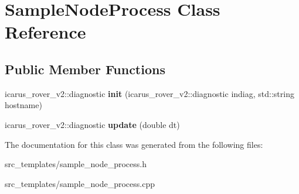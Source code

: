 \hypertarget{classSampleNodeProcess}{}\section{Sample\+Node\+Process Class Reference}
\label{classSampleNodeProcess}
\subsection*{Public Member Functions}
\begin{DoxyCompactItemize}
\item 
\mbox{\label{classSampleNodeProcess_ad4cb47b8fc3e7f8bbb010193188fa9b3}} 
icarus\+\_\+rover\+\_\+v2\+::diagnostic {\bfseries init} (icarus\+\_\+rover\+\_\+v2\+::diagnostic indiag, std\+::string hostname)
\item 
\mbox{\label{classSampleNodeProcess_ae6f2199a0b5394d819927995e5fb2ed9}} 
icarus\+\_\+rover\+\_\+v2\+::diagnostic {\bfseries update} (double dt)
\end{DoxyCompactItemize}


The documentation for this class was generated from the following files\+:\begin{DoxyCompactItemize}
\item 
src\+\_\+templates/sample\+\_\+node\+\_\+process.\+h\item 
src\+\_\+templates/sample\+\_\+node\+\_\+process.\+cpp\end{DoxyCompactItemize}

